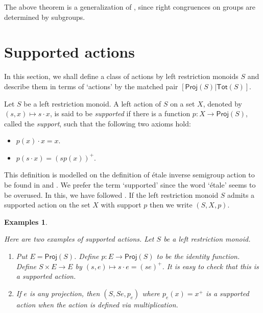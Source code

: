 \documentclass[a4paper]{amsart}
\newtheorem{examples}[theorem]{Examples}
\begin{document}
The above theorem is a generalization of \cite{EF}, since right congruences on groups are determined by subgroups.




\section{Supported actions}

In this section, we shall define a class of actions by left restriction monoids $S$
and describe them in terms of `actions' by the matched pair $[\mathsf{Proj}(S)|\mathsf{Tot}(S)]$.

Let $S$ be a left restriction monoid.
A left action of $S$ on a set $X$, denoted by $(s,x) \mapsto s \cdot x$, is said to be {\em supported}
if there is a function $p \colon X \rightarrow \mathsf{Proj}(S)$, called the {\em support}, such that the following two axioms hold:
\begin{itemize}
\item[{\rm (E1).}] $p(x) \cdot x = x$. 
\item[{\rm (E2).}] $p(s \cdot x) = (sp(x))^{+}$.
\end{itemize}
This definition is modelled on the definition of \'etale inverse semigroup action
to be found in \cite{F2010} and \cite{S2011}. 
We prefer the term `supported' since the word `\'etale' seems to be overused.
In this, we have followed \cite{LR2021}. 
If the left restriction monoid $S$ admits a supported action on the set $X$ with support $p$ then we write $(S,X,p)$.

\begin{examples}\label{exs:examples}
{\em Here are two examples of supported actions.
Let $S$ be a left restriction monoid.
\begin{enumerate}
\item  Put $E = \mathsf{Proj}(S)$.
Define $p \colon E \rightarrow \mathsf{Proj}(S)$ to be the identity function.
Define $S \times E \rightarrow E$ by $(s,e) \mapsto s \cdot e = (se)^{+}$.
It is easy to check that this is a supported action.

\item If $e$ is any projection, then $(S,Se,p_{e})$ where $p_{e}(x) = x^{+}$
is a supported action when the action is defined via multiplication.
\end{enumerate}
}
\end{examples}
\end{document}
